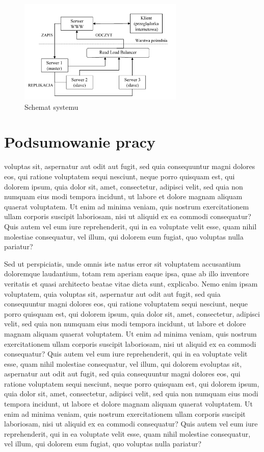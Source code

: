 \documentclass{mgr}
\begin{document}
\begin{figure}[!ht]
	\centering
	\includegraphics[width=0.7\textwidth]{images/struktura_systemu.png}
	\caption{Schemat systemu}
	\label{fig:system-diagram}
\end{figure}

\chapter{Podsumowanie pracy}
voluptas sit, aspernatur aut odit aut fugit, sed quia consequuntur magni dolores eos, qui ratione voluptatem sequi nesciunt, neque porro quisquam est, qui dolorem ipsum, quia dolor sit, amet, consectetur, adipisci velit, sed quia non numquam eius modi tempora incidunt, ut labore et dolore magnam aliquam quaerat voluptatem. Ut enim ad minima veniam, quis nostrum exercitationem ullam corporis suscipit laboriosam, nisi ut aliquid ex ea commodi consequatur? Quis autem vel eum iure reprehenderit, qui in ea voluptate velit esse, quam nihil molestiae consequatur, vel illum, qui dolorem eum fugiat, quo voluptas nulla pariatur?

Sed ut perspiciatis, unde omnis iste natus error sit voluptatem accusantium doloremque laudantium, totam rem aperiam eaque ipsa, quae ab illo inventore veritatis et quasi architecto beatae vitae dicta sunt, explicabo. Nemo enim ipsam voluptatem, quia voluptas sit, aspernatur aut odit aut fugit, sed quia consequuntur magni dolores eos, qui ratione voluptatem sequi nesciunt, neque porro quisquam est, qui dolorem ipsum, quia dolor sit, amet, consectetur, adipisci velit, sed quia non numquam eius modi tempora incidunt, ut labore et dolore magnam aliquam quaerat voluptatem. Ut enim ad minima veniam, quis nostrum exercitationem ullam corporis suscipit laboriosam, nisi ut aliquid ex ea commodi consequatur? Quis autem vel eum iure reprehenderit, qui in ea voluptate velit esse, quam nihil molestiae consequatur, vel illum, qui dolorem evoluptas sit, aspernatur aut odit aut fugit, sed quia consequuntur magni dolores eos, qui ratione voluptatem sequi nesciunt, neque porro quisquam est, qui dolorem ipsum, quia dolor sit, amet, consectetur, adipisci velit, sed quia non numquam eius modi tempora incidunt, ut labore et dolore magnam aliquam quaerat voluptatem. Ut enim ad minima veniam, quis nostrum exercitationem ullam corporis suscipit laboriosam, nisi ut aliquid ex ea commodi consequatur? Quis autem vel eum iure reprehenderit, qui in ea voluptate velit esse, quam nihil molestiae consequatur, vel illum, qui dolorem eum fugiat, quo voluptas nulla pariatur?
\end{document}
